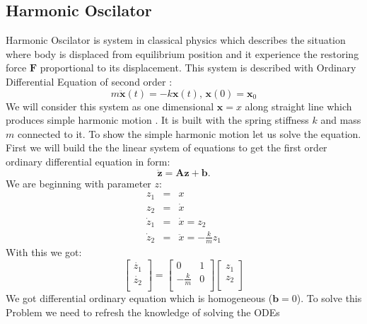 \subsection{Harmonic Oscilator}
Harmonic Oscilator is  system  in classical physics which describes the situation where body is displaced from equilibrium position and it experience the restoring force $\mathbf{F}$ proportional to its displacement.\cite{osci}\cite{osci2} This system is described with Ordinary Differential Equation of second order : 
\begin{equation}
	m\ddot{\mathbf{x}}(t) = -k\mathbf{x}(t) \texttt{,   } \mathbf{x}(0)= \mathbf{x}_0
\end{equation}
We will consider this system as one dimensional $\mathbf{x}= x$ along straight line which produces simple harmonic motion \cite{osci}. It is built with the spring  stiffness $k$ and mass $m$ connected to it. To show the simple harmonic motion let us solve the equation.\\
First we will build the the linear system of equations to get the first order ordinary differential equation in form: \begin{equation}
	\ddot{\mathbf{z}}= \mathbf{A}\mathbf{z} + \mathbf{b}.
\end{equation}
We are beginning with parameter $z$:
\begin{eqnarray}
	z_1 &=& x\\
	z_2 &=& \dot{x}\\
	\dot{z}_1 &=& \dot{x} = z_2\\
	\dot{z}_2 &=& \ddot{x} = -\frac{k}{m}z_1 
\end{eqnarray}
With this we got:
\begin{equation}
	\begin{bmatrix}
		\dot{z_1}\\
		\dot{z_2}\\
	\end{bmatrix} = \begin{bmatrix}
	0 & 1\\
	-\frac{k}{m} & 0\\
	\end{bmatrix}
	\begin{bmatrix}
		z_1\\
		z_2\\
	\end{bmatrix}
\end{equation}
We got differential ordinary equation which is homogeneous ($\mathbf{b}=0$). To solve this Problem we need to refresh the knowledge of solving the ODEs 

